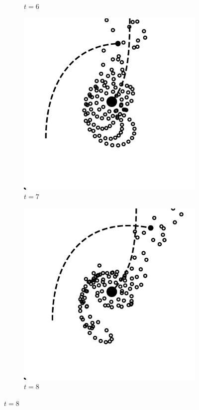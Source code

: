 \documentclass[11pt,twocolumn]{article}
\begin{document}
\begin{figure}[!htbp]
\begin{subfigure}[b]{0.2\textwidth}
    				\caption{$t = 6$}
  			\end{subfigure}
            \hfill
            \begin{subfigure}[b]{0.2\textwidth}
    			\includegraphics[width=\textwidth]{fig_4/Fig4_7_000000_0.pdf}
    				\caption{$t = 7$}
  			\end{subfigure}
            \hfill
            \begin{subfigure}[b]{0.2\textwidth}
    			\includegraphics[width=\textwidth]{fig_4/Fig4_8_000000_0.pdf}
    				\caption{$t = 8$}
  			\end{subfigure}
  			

\end{figure}
\end{document}
